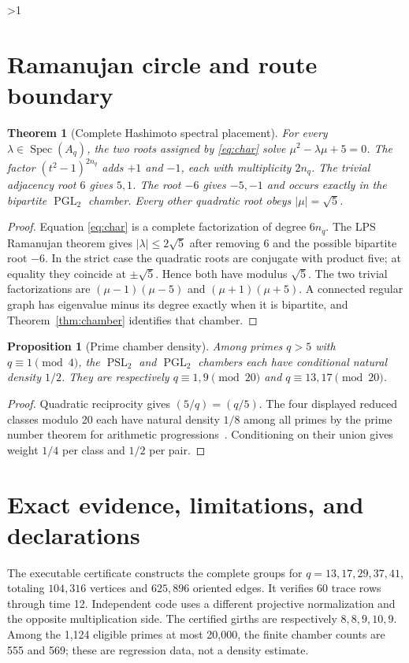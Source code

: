 \documentclass[10pt]{article}
\providecommand{\CRevisionRound}{2}
\newtheorem{theorem}{Theorem}
\newtheorem{proposition}{Proposition}
\newcommand{\PSL}{\operatorname{PSL}}
\newcommand{\PGL}{\operatorname{PGL}}
\newcommand{\Spec}{\operatorname{Spec}}
\begin{document}
\ifnum\CRevisionRound>1
\section{Ramanujan circle and route boundary}
\begin{theorem}[Complete Hashimoto spectral placement]\label{thm:circle}
For every $\lambda\in\Spec(A_q)$, the two roots assigned by
\eqref{eq:char} solve $\mu^2-\lambda\mu+5=0$.
The factor $(t^2-1)^{2n_q}$ adds $+1$ and $-1$, each with multiplicity
$2n_q$. The trivial adjacency root $6$ gives $5,1$. The root $-6$ gives
$-5,-1$ and occurs exactly in the bipartite $\PGL_2$ chamber. Every other
quadratic root obeys $|\mu|=\sqrt5$.
\end{theorem}

\begin{proof}
Equation \eqref{eq:char} is a complete factorization of degree $6n_q$.
The LPS Ramanujan theorem gives $|\lambda|\le2\sqrt5$ after removing $6$
and the possible bipartite root $-6$. In the strict case the quadratic
roots are conjugate with product five; at equality they coincide at
$\pm\sqrt5$. Hence both have modulus $\sqrt5$. The two trivial
factorizations are $(\mu-1)(\mu-5)$ and $(\mu+1)(\mu+5)$. A connected
regular graph has eigenvalue minus its degree exactly when it is bipartite,
and Theorem~\ref{thm:chamber} identifies that chamber.
\end{proof}

\begin{proposition}[Prime chamber density]\label{prop:density}
Among primes $q>5$ with $q\equiv1\pmod4$, the $\PSL_2$ and $\PGL_2$
chambers each have conditional natural density $1/2$. They are respectively
$q\equiv1,9\pmod{20}$ and $q\equiv13,17\pmod{20}$.
\end{proposition}

\begin{proof}
Quadratic reciprocity gives $(5/q)=(q/5)$. The four displayed reduced
classes modulo 20 each have natural density $1/8$ among all primes by the
prime number theorem for arithmetic progressions~\cite{Davenport}.
Conditioning on their union gives weight $1/4$ per class and $1/2$ per pair.
\end{proof}

\section{Exact evidence, limitations, and declarations}
The executable certificate constructs the complete groups for
$q=13,17,29,37,41$, totaling $104{,}316$ vertices and $625{,}896$ oriented
edges. It verifies 60 trace rows through time 12. Independent code uses a
different projective normalization and the opposite multiplication side.
The certified girths are respectively $8,8,9,10,9$. Among the 1,124
eligible primes at most 20,000, the finite chamber counts are 555 and 569;
these are regression data, not a density estimate.
\end{document}
